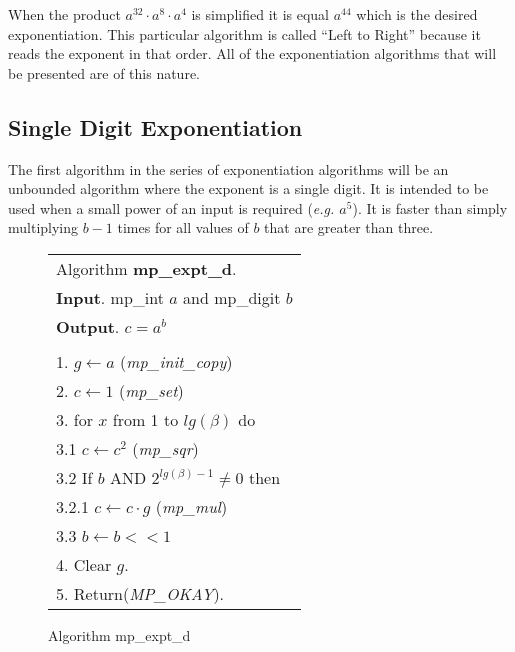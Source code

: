 \documentclass[b5paper]{book}
\begin{document}
When the product $a^{32} \cdot a^8 \cdot a^4$ is simplified it is equal $a^{44}$ which is the desired exponentiation.  This particular algorithm is 
called ``Left to Right'' because it reads the exponent in that order.  All of the exponentiation algorithms that will be presented are of this nature.  

\subsection{Single Digit Exponentiation}
The first algorithm in the series of exponentiation algorithms will be an unbounded algorithm where the exponent is a single digit.  It is intended 
to be used when a small power of an input is required (\textit{e.g. $a^5$}).  It is faster than simply multiplying $b - 1$ times for all values of 
$b$ that are greater than three.  

\newpage\begin{figure}[!here]
\begin{small}
\begin{center}
\begin{tabular}{l}
\hline Algorithm \textbf{mp\_expt\_d}. \\
\textbf{Input}.   mp\_int $a$ and mp\_digit $b$ \\
\textbf{Output}.  $c = a^b$ \\
\hline \\
1.  $g \leftarrow a$ (\textit{mp\_init\_copy}) \\
2.  $c \leftarrow 1$ (\textit{mp\_set}) \\
3.  for $x$ from 1 to $lg(\beta)$ do \\
\hspace{3mm}3.1  $c \leftarrow c^2$ (\textit{mp\_sqr}) \\
\hspace{3mm}3.2  If $b$ AND $2^{lg(\beta) - 1} \ne 0$ then \\
\hspace{6mm}3.2.1  $c \leftarrow c \cdot g$ (\textit{mp\_mul}) \\
\hspace{3mm}3.3  $b \leftarrow b << 1$ \\
4.  Clear $g$. \\
5.  Return(\textit{MP\_OKAY}). \\
\hline
\end{tabular}
\end{center}
\end{small}
\caption{Algorithm mp\_expt\_d}
\end{figure}
\end{document}

